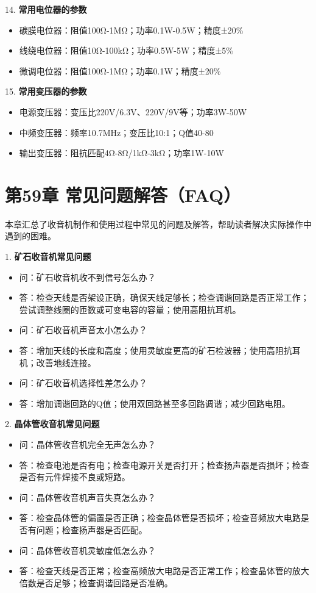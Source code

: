 \documentclass[12pt,UTF8]{ctexbook}
\begin{document}
14. \textbf{常用电位器的参数}
    \begin{itemize}[leftmargin=3.5em]
    \item 碳膜电位器：阻值100Ω-1MΩ；功率0.1W-0.5W；精度±20\%
    \item 线绕电位器：阻值10Ω-100kΩ；功率0.5W-5W；精度±5\%
    \item 微调电位器：阻值100Ω-1MΩ；功率0.1W；精度±20\%
    \end{itemize}

15. \textbf{常用变压器的参数}
    \begin{itemize}[leftmargin=3.5em]
    \item 电源变压器：变压比220V/6.3V、220V/9V等；功率3W-50W
    \item 中频变压器：频率10.7MHz；变压比10:1；Q值40-80
    \item 输出变压器：阻抗匹配4Ω-8Ω/1kΩ-3kΩ；功率1W-10W
    \end{itemize}
\chapter*{第59章 常见问题解答（FAQ）}

本章汇总了收音机制作和使用过程中常见的问题及解答，帮助读者解决实际操作中遇到的困难。

1. \textbf{矿石收音机常见问题}
   \begin{itemize}[leftmargin=3.5em]
   \item 问：矿石收音机收不到信号怎么办？
   \item 答：检查天线是否架设正确，确保天线足够长；检查调谐回路是否正常工作；尝试调整线圈的匝数或可变电容的容量；使用高阻抗耳机。
   \item 问：矿石收音机声音太小怎么办？
   \item 答：增加天线的长度和高度；使用灵敏度更高的矿石检波器；使用高阻抗耳机；改善地线连接。
   \item 问：矿石收音机选择性差怎么办？
   \item 答：增加调谐回路的Q值；使用双回路甚至多回路调谐；减少回路电阻。
   \end{itemize}

2. \textbf{晶体管收音机常见问题}
   \begin{itemize}[leftmargin=3.5em]
   \item 问：晶体管收音机完全无声怎么办？
   \item 答：检查电池是否有电；检查电源开关是否打开；检查扬声器是否损坏；检查是否有元件焊接不良或短路。
   \item 问：晶体管收音机声音失真怎么办？
   \item 答：检查晶体管的偏置是否正确；检查晶体管是否损坏；检查音频放大电路是否有问题；检查扬声器是否匹配。
   \item 问：晶体管收音机灵敏度低怎么办？
   \item 答：检查天线是否正常；检查高频放大电路是否正常工作；检查晶体管的放大倍数是否足够；检查调谐回路是否准确。
   \end{itemize}
\end{document}
